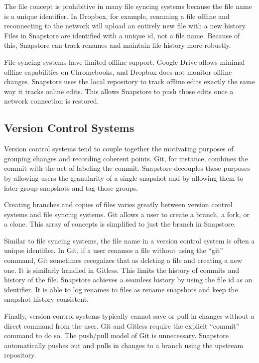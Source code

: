 The file concept is prohibitive in many file syncing systems because the file name is a unique identifier. In Dropbox, for example, renaming a file offline and reconnecting to the network will upload an entirely new file with a new history. Files in Snapstore are identified with a unique id, not a file name. Because of this, Snapstore can track renames and maintain file history more robustly.

File syncing systems have limited offline support. Google Drive allows minimal offline capabilities on Chromebooks, and Dropbox does not monitor offline changes. Snapstore uses the local repository to track offline edits exactly the same way it tracks online edits. This allows Snapstore to push those edits once a network connection is restored.

\subsection{Version Control Systems}

Version control systems tend to couple together the motivating purposes of grouping changes and recording coherent points. Git, for instance, combines the commit with the act of labeling the commit. Snapstore decouples these purposes by allowing users the granularity of a single snapshot and by allowing them to later group snapshots and tag those groups.

Creating branches and copies of files varies greatly between version control systems and file syncing systems. Git allows a user to create a branch, a fork, or a clone. This array of concepts is simplified to just the branch in Snapstore. 

Similar to file syncing systems, the file name in a version control system is often a unique identifier. In Git, if a user renames a file without using the ``git'' command, Git sometimes recognizes that as deleting a file and creating a new one. It is similarly handled in Gitless. This limits the history of commits and history of the file. Snapstore achieves a seamless history by using the file id as an identifier. It is able to log renames to files as rename snapshots and keep the snapshot history consistent.

Finally, version control systems typically cannot save or pull in changes without a direct command from the user. Git and Gitless require the explicit ``commit'' command to do so. The push/pull model of Git is unnecessary. Snapstore automatically pushes out and pulls in changes to a branch using the upstream repository.




